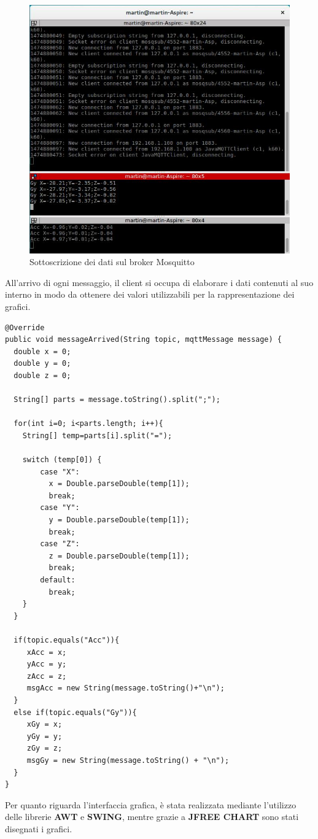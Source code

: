 \documentclass[]{scrartcl}
\begin{document}
\begin{figure}[ht]
	\centering
	\includegraphics[scale=0.3]{broker.png}
	\caption{Sottoscrizione dei dati sul broker Mosquitto}
\end{figure}
All'arrivo di ogni messaggio, il client si occupa di elaborare i dati contenuti al suo interno in modo da ottenere dei valori utilizzabili per la rappresentazione dei grafici. 
\newpage
\begingroup
\fontsize{9.5pt}{8pt}\selectfont
\begin{lstlisting}[frame=single]
@Override
public void messageArrived(String topic, mqttMessage message) {
  double x = 0;
  double y = 0;
  double z = 0;

  String[] parts = message.toString().split(";");

  for(int i=0; i<parts.length; i++){
    String[] temp=parts[i].split("=");

  	switch (temp[0]) {
        case "X":
          x = Double.parseDouble(temp[1]);
          break;
        case "Y":
          y = Double.parseDouble(temp[1]);
          break;
        case "Z":
          z = Double.parseDouble(temp[1]);
          break;
        default:
          break;
    }			
  }

  if(topic.equals("Acc")){						
     xAcc = x;
     yAcc = y;
     zAcc = z;
     msgAcc = new String(message.toString()+"\n");
  }
  else if(topic.equals("Gy")){
     xGy = x;
     yGy = y;
     zGy = z;
     msgGy = new String(message.toString() + "\n");		
  }
}
\end{lstlisting}
\endgroup
Per quanto riguarda l'interfaccia grafica, è stata realizzata mediante l'utilizzo delle librerie \textbf{AWT} e \textbf{SWING}, mentre grazie a \textbf{JFREE CHART} sono stati disegnati i grafici.
\end{document}
